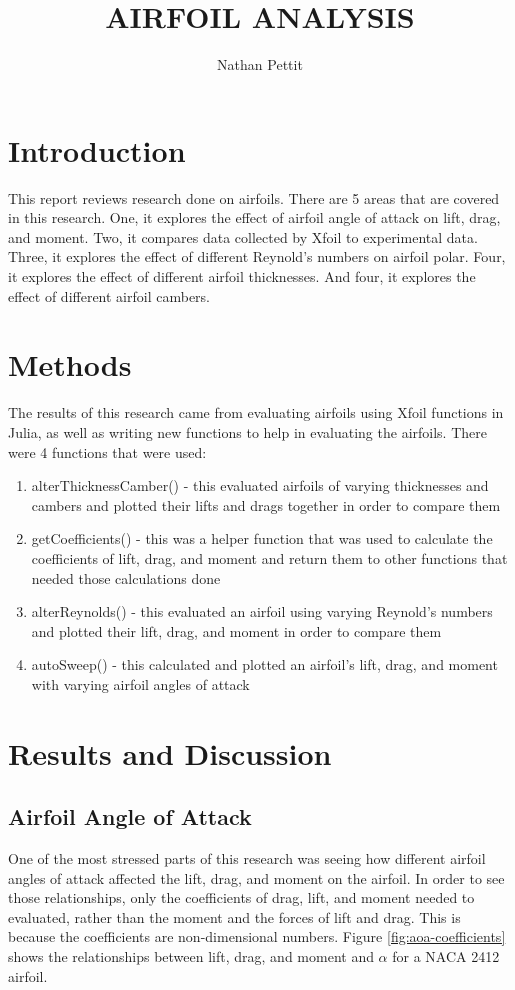 \documentclass{journal}
\title{AIRFOIL ANALYSIS}
\author{Nathan Pettit}
\begin{document}
	
	\maketitle	
	
	\section{Introduction}
	This report reviews research done on airfoils. There are 5 areas that are covered in this research. One, it explores the effect of airfoil angle of attack on lift, drag, and moment. Two, it compares data collected by Xfoil to experimental data. Three, it explores the effect of different Reynold's numbers on airfoil polar. Four, it explores the effect of different airfoil thicknesses. And four, it explores the effect of different airfoil cambers.
	
	\section{Methods}
	The results of this research came from evaluating airfoils using Xfoil functions in Julia, as well as writing new functions to help in evaluating the airfoils. There were 4 functions that were  used:
	
	\begin{enumerate}
		\item alterThicknessCamber() - this evaluated airfoils of varying thicknesses and cambers and plotted their lifts and drags together in order to compare them
		\item getCoefficients() - this was a helper function that was used to calculate the coefficients of lift, drag, and moment and return them to other functions that needed those calculations done
		\item alterReynolds() - this evaluated an airfoil using varying Reynold's numbers and plotted their lift, drag, and moment in order to compare them
		\item autoSweep() - this calculated and plotted an airfoil's lift, drag, and moment with varying airfoil angles of attack
	\end{enumerate}
	
	\section{Results and Discussion}
	
	\subsection{Airfoil Angle  of Attack}
	One of the most stressed parts of this research was seeing how different airfoil angles of attack affected the lift, drag, and moment on the airfoil. In order to see those relationships, only the coefficients of drag, lift, and moment needed to evaluated, rather than the moment and the forces of lift and drag. This is because the coefficients are non-dimensional numbers. Figure \ref{fig:aoa-coefficients} shows the relationships between lift, drag, and moment and \(\alpha\) for a NACA 2412 airfoil.
	
\end{document}
